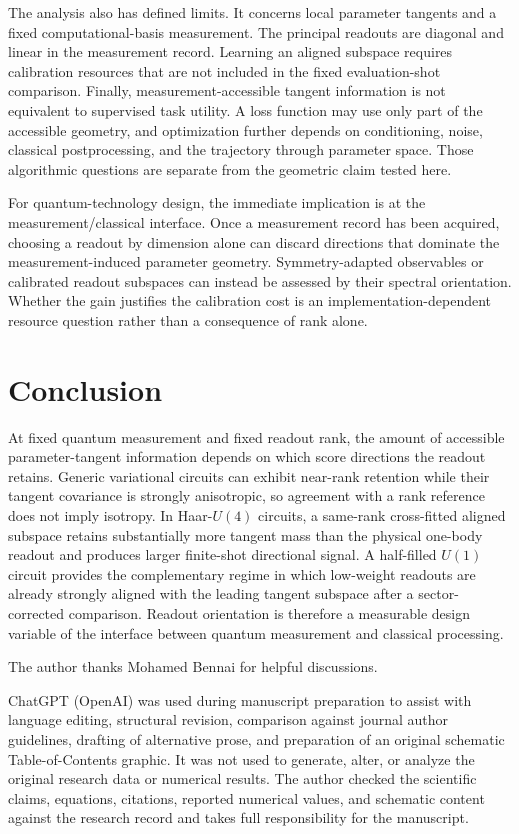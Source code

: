 \documentclass[ASNA,twocolumn]{USG}
\begin{document}
The analysis also has defined limits. It concerns local parameter tangents and a fixed computational-basis measurement. The principal readouts are diagonal and linear in the measurement record. Learning an aligned subspace requires calibration resources that are not included in the fixed evaluation-shot comparison. Finally, measurement-accessible tangent information is not equivalent to supervised task utility. A loss function may use only part of the accessible geometry, and optimization further depends on conditioning, noise, classical postprocessing, and the trajectory through parameter space. Those algorithmic questions are separate from the geometric claim tested here.

For quantum-technology design, the immediate implication is at the measurement/classical interface. Once a measurement record has been acquired, choosing a readout by dimension alone can discard directions that dominate the measurement-induced parameter geometry. Symmetry-adapted observables or calibrated readout subspaces can instead be assessed by their spectral orientation. Whether the gain justifies the calibration cost is an implementation-dependent resource question rather than a consequence of rank alone.

\section{Conclusion}

At fixed quantum measurement and fixed readout rank, the amount of accessible parameter-tangent information depends on which score directions the readout retains. Generic variational circuits can exhibit near-rank retention while their tangent covariance is strongly anisotropic, so agreement with a rank reference does not imply isotropy. In Haar-$U(4)$ circuits, a same-rank cross-fitted aligned subspace retains substantially more tangent mass than the physical one-body readout and produces larger finite-shot directional signal. A half-filled $U(1)$ circuit provides the complementary regime in which low-weight readouts are already strongly aligned with the leading tangent subspace after a sector-corrected comparison. Readout orientation is therefore a measurable design variable of the interface between quantum measurement and classical processing.

The author thanks Mohamed Bennai for helpful discussions.

ChatGPT (OpenAI) was used during manuscript preparation to assist with language editing, structural revision, comparison against journal author guidelines, drafting of alternative prose, and preparation of an original schematic Table-of-Contents graphic. It was not used to generate, alter, or analyze the original research data or numerical results. The author checked the scientific claims, equations, citations, reported numerical values, and schematic content against the research record and takes full responsibility for the manuscript.
\end{document}
